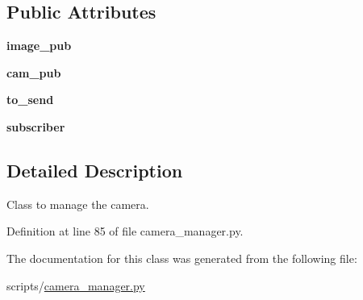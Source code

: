 \subsection*{Public Attributes}
\begin{DoxyCompactItemize}
\item 
{\bfseries image\+\_\+pub}\hypertarget{classcamera__manager_1_1camera__manager__fnct_aef528145d25278bfd785609468d1cbe5}{}\label{classcamera__manager_1_1camera__manager__fnct_aef528145d25278bfd785609468d1cbe5}

\item 
{\bfseries cam\+\_\+pub}\hypertarget{classcamera__manager_1_1camera__manager__fnct_a8286b1c120b8c78105659bddd3c76ae4}{}\label{classcamera__manager_1_1camera__manager__fnct_a8286b1c120b8c78105659bddd3c76ae4}

\item 
{\bfseries to\+\_\+send}\hypertarget{classcamera__manager_1_1camera__manager__fnct_a64a8436a208f1cd0f0724195c1cf6e65}{}\label{classcamera__manager_1_1camera__manager__fnct_a64a8436a208f1cd0f0724195c1cf6e65}

\item 
{\bfseries subscriber}\hypertarget{classcamera__manager_1_1camera__manager__fnct_ab601d8ee993e58f5aa8cc0de36bf17ee}{}\label{classcamera__manager_1_1camera__manager__fnct_ab601d8ee993e58f5aa8cc0de36bf17ee}

\end{DoxyCompactItemize}


\subsection{Detailed Description}
Class to manage the camera. 

Definition at line 85 of file camera\+\_\+manager.\+py.



The documentation for this class was generated from the following file\+:\begin{DoxyCompactItemize}
\item 
scripts/\hyperlink{camera__manager_8py}{camera\+\_\+manager.\+py}\end{DoxyCompactItemize}
